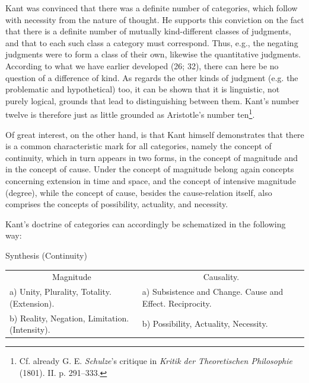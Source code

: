 \documentclass[12pt,a4paper]{book}
\newcommand{\opage}[1]{\marginnote{\footnotesize\textit{[#1]}}}
\begin{document}
Kant was convinced that there was a definite number of categories, which
follow with necessity from the nature of thought. He supports this
conviction on the fact that there is a definite number of mutually
kind-different classes of judgments, and that to each such class a category
must correspond. Thus, e.g., the negating judgments were to form a class of
their own, likewise the quantitative judgments. According to what we have
earlier developed (26; 32), there can here be no question of a difference of
kind. As regards the other kinds of judgment (e.g. the problematic and
hypothetical) too, it can be shown that it is linguistic, not purely
logical, grounds that lead to distinguishing between them. Kant's number
twelve is therefore just as little grounded as Aristotle's number
ten\footnote{Cf. already G. E. \emph{Schulze}'s critique in \emph{Kritik
der Theoretischen Philosophie} (1801). II. p. 291--333.}.

\opage{145}Of great interest, on the other hand, is that Kant himself demonstrates that
there is a common characteristic mark for all categories, namely the concept
of continuity, which in turn appears in two forms, in the concept of
magnitude and in the concept of cause. Under the concept of magnitude belong
again concepts concerning extension in time and space, and the concept of
intensive magnitude (degree), while the concept of cause, besides the
cause-relation itself, also comprises the concepts of possibility,
actuality, and necessity.

Kant's doctrine of categories can accordingly be schematized in the
following way:

\begin{center}
Synthesis (Continuity)

\medskip
\begin{tabular}{p{} p{}}
\multicolumn{1}{c}{Magnitude} & \multicolumn{1}{c}{Causality.}\\[2pt]
a) Unity, Plurality, Totality. (Extension). & a) Subsistence and Change.
Cause and Effect. Reciprocity.\\
b) Reality, Negation, Limitation. (Intensity). & b) Possibility, Actuality,
Necessity.\\
\end{tabular}
\end{center}
\end{document}
